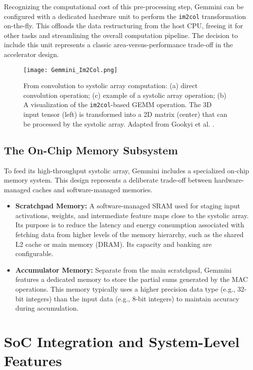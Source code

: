 Recognizing the computational cost of this pre-processing step, Gemmini can be configured with a dedicated hardware unit to perform the \texttt{im2col} transformation on-the-fly. This offloads the data restructuring from the host CPU, freeing it for other tasks and streamlining the overall computation pipeline. The decision to include this unit represents a classic area-versus-performance trade-off in the accelerator design.

\begin{figure}[h!]
    \centering
    \texttt{[image: Gemmini\_Im2Col.png]}
    \caption[The im2col Transformation]{From convolution to systolic array computation: (a) direct convolution operation; (c) example of a systolic array operation; (b) A visualization of the \texttt{im2col}-based GEMM operation. The 3D input tensor (left) is transformed into a 2D matrix (center) that can be processed by the systolic array. Adapted from Gookyi et al. \cite{gookyi2023gemmini_case_study}.}
    \label{fig:im2col}
\end{figure}


\subsection{The On-Chip Memory Subsystem}
To feed its high-throughput systolic array, Gemmini includes a specialized on-chip memory system. This design represents a deliberate trade-off between hardware-managed caches and software-managed memories.
\begin{itemize}
    \item \textbf{Scratchpad Memory:} A software-managed SRAM used for staging input activations, weights, and intermediate feature maps close to the systolic array. Its purpose is to reduce the latency and energy consumption associated with fetching data from higher levels of the memory hierarchy, such as the shared L2 cache or main memory (DRAM). Its capacity and banking are configurable.
    \item \textbf{Accumulator Memory:} Separate from the main scratchpad, Gemmini features a dedicated memory to store the partial sums generated by the MAC operations. This memory typically uses a higher precision data type (e.g., 32-bit integers) than the input data (e.g., 8-bit integers) to maintain accuracy during accumulation.
\end{itemize}

\section{SoC Integration and System-Level Features}
\label{sec:gemmini_integration}


